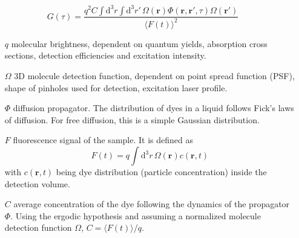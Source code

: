 	\begin{minipage}{\textwidth}
	\begin{equation}
	G(\tau) = \frac{  q^2 C \int \! \mathrm{d}^3 r \int \! \mathrm{d}^3 r'  \, \Omega(\mathbf{r})\Phi(\mathbf{r}, \mathbf{r'}, \tau) \Omega(\mathbf{r'})  }{\langle F(t) \rangle^2}
	\end{equation}
	\begin{itemize} \small
	\item[$q$] molecular brightness, dependent on quantum yields, absorption cross sections, detection efficiencies and excitation intensity.
	\item[$\Omega$] 3D molecule detection function, dependent on point spread function (PSF), shape of pinholes used for detection, excitation laser profile.
	\item[$\Phi$] diffusion propagator. The distribution of dyes in a liquid follows Fick's laws of diffusion. For free diffusion, this is a simple Gaussian distribution.
	\item[$F$] fluorescence signal of the sample. It is defined as
	\[ F(t) = q \int \! \mathrm{d}^3 r \, \Omega(\mathbf{r}) c(\mathbf{r}, t) \] with $c(\mathbf{r}, t)$ being dye distribution (particle concentration) inside the detection volume.
		\item[$C$] average concentration of the dye following the dynamics of the propagator $\Phi$. Using the ergodic hypothesis and assuming a normalized molecule detection function $\Omega$, $ C = \langle F(t) \rangle / q $.
	\end{itemize}
	\end{minipage}
	
	
